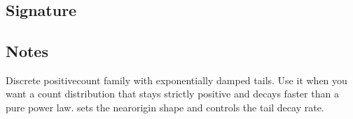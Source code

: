 \documentclass[letterpaper,10pt,english]{sphinxmanual}
\begin{document}
\section{}
\label{\detokenize{distribution_catalog:planck}}

\subsection{Signature}
\label{\detokenize{distribution_catalog:id94}}
\begin{sphinxVerbatim}[commandchars=\\\{\}]
\end{sphinxVerbatim}


\subsection{Notes}
\label{\detokenize{distribution_catalog:id95}}
\sphinxAtStartPar
Discrete positive\sphinxhyphen{}count family with exponentially damped tails. Use it when you want a count distribution that stays strictly positive and decays faster than a pure power law.  sets the near\sphinxhyphen{}origin shape and  controls the tail decay rate.
\end{document}

